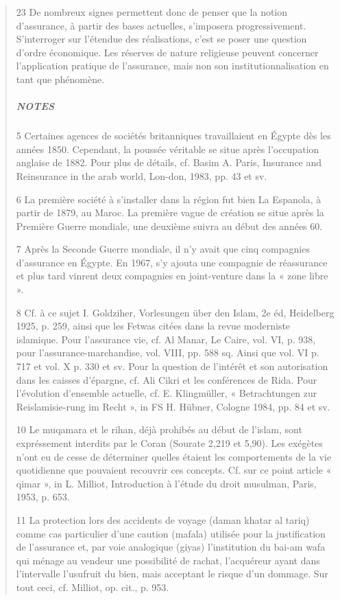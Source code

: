 \begin{quote}
23 De nombreux signes permettent donc de penser que la notion d’assurance, à partir des bases actuelles, s’imposera progressivement. S’interroger sur l’étendue des réalisations, c’est se poser une question d’ordre économique. Les réserves de nature religieuse peuvent concerner l’application pratique de l’assurance, mais non son institutionnalisation en tant que phénomène.

\subparagraph{NOTES}
 



5 Certaines agences de sociétés britanniques travaillaient en Égypte dès les années 1850. Cependant, la poussée véritable se situe après l’occupation anglaise de 1882. Pour plus de détails, cf. Basim A. Paris, Insurance and Reinsurance in the arab world, Lon-don, 1983, pp. 43 et sv.

6 La première société à s’installer dans la région fut bien La Espanola, à partir de 1879, au Maroc. La première vague de création se situe après la Première Guerre mondiale, une deuxième suivra au début des années 60.

7 Après la Seconde Guerre mondiale, il n’y avait que cinq compagnies d’assurance en Égypte. En 1967, s’y ajouta une compagnie de réassurance et plus tard vinrent deux compagnies en joint-venture dans la « zone libre ».

8 Cf. à ce sujet I. Goldziher, Vorlesungen über den Islam, 2e éd, Heidelberg 1925, p. 259, ainsi que les Fetwas citées dans la revue moderniste islamique. Pour l’assurance vie, cf. Al Manar, Le Caire, vol. VI, p. 938, pour l’assurance-marchandise, vol. VIII, pp. 588 sq. Ainsi que vol. VI p. 717 et vol. X p. 330 et sv. Pour la question de l’intérêt et son autorisation dans les caisses d’épargne, cf. Ali Cikri et les conférences de Rida. Pour l’évolution d’ensemble actuelle, cf. E. Klingmüller, « Betrachtungen zur Reislamisie-rung im Recht », in FS H. Hübner, Cologne 1984, pp. 84 et sv.



10 Le muqamara et le rihan, déjà prohibés au début de l’islam, sont expréssement interdits par le Coran (Sourate 2,219 et 5,90). Les exégètes n’ont eu de cesse de déterminer quelles étaient les comportements de la vie quotidienne que pouvaient recouvrir ces concepts. Cf. sur ce point article « qimar », in L. Milliot, Introduction à l’étude du droit musulman, Paris, 1953, p. 653.

11 La protection lors des accidents de voyage (daman khatar al tariq) comme cas particulier d’une caution (mafala) utilisée pour la justification de l’assurance et, par voie analogique (giyas) l’institution du bai-am wafa qui ménage au vendeur une possibilité de rachat, l’acquéreur ayant dans l’intervalle l’usufruit du bien, mais acceptant le risque d’un dommage. Sur tout ceci, cf. Milliot, op. cit., p. 953.




\end{quote}
